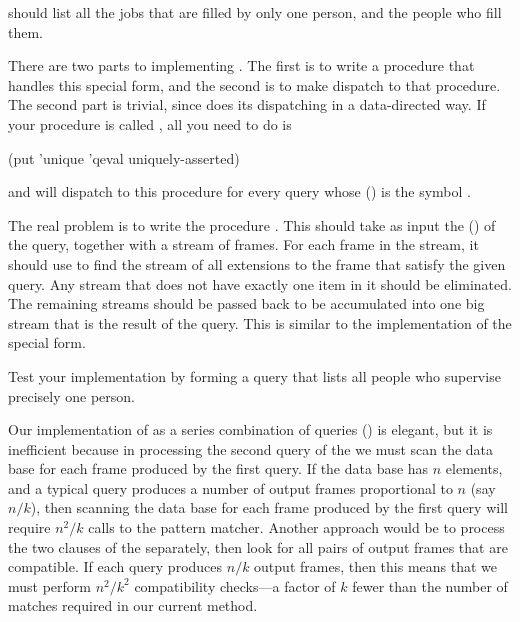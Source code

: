 \begin{exerciseGroup}
\noindent
should list all the jobs that are filled by only one person, and the people who
fill them.

There are two parts to implementing .  The first is to write a
procedure that handles this special form, and the second is to make
 dispatch to that procedure.  The second part is trivial, since
 does its dispatching in a data-directed way.  If your procedure is
called , all you need to do is

\begin{codeBlock}
(put 'unique 'qeval uniquely-asserted)
\end{codeBlock}

\noindent
and  will dispatch to this procedure for every query whose
 () is the symbol .

The real problem is to write the procedure .  This
should take as input the  () of the 
query, together with a stream of frames.  For each frame in the stream, it
should use  to find the stream of all extensions to the frame that
satisfy the given query.  Any stream that does not have exactly one item in it
should be eliminated.  The remaining streams should be passed back to be
accumulated into one big stream that is the result of the  query.
This is similar to the implementation of the  special form.

Test your implementation by forming a query that lists all people who supervise
precisely one person.

\label{Exercise 4.76}
 Our implementation of 
as a series combination of queries () is elegant, but it is
inefficient because in processing the second query of the  we must
scan the data base for each frame produced by the first query.  If the data
base has \( n \) elements, and a typical query produces a number of output frames
proportional to \( n \) (say \( n / k \)), then scanning the data base for each
frame produced by the first query will require \( n^2 / k \) calls to the
pattern matcher.  Another approach would be to process the two clauses of the
 separately, then look for all pairs of output frames that are
compatible.  If each query produces \( n / k \) output frames, then this means
that we must perform \( n^2 / k^2 \) compatibility checks---a factor of \( k \)
fewer than the number of matches required in our current method.


\end{exerciseGroup}
